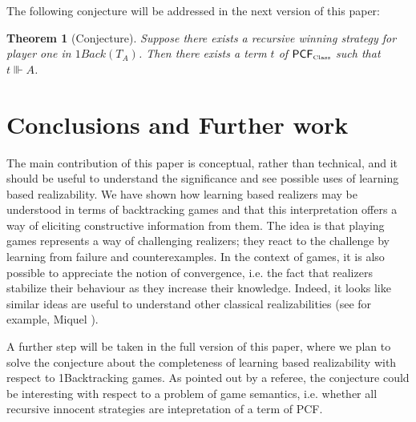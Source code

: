 \documentclass[copyright,creativecommons]{eptcs}
\newcommand{\Class}                    {\mbox{\tiny Class}}
\newcommand{\PRclass}                    {{\mathsf{PCF}_{\Class}}}
\newtheorem{theorem}{Theorem}
\begin{document}
The following conjecture will be addressed in the next version of this paper:

\begin{theorem}[Conjecture]
Suppose there exists a recursive winning strategy for player one in $1Back(T_A)$. Then there exists a term $t$ of $\PRclass$ such that $t\Vvdash A$.

\end{theorem}

\section{Conclusions and Further work}

The main contribution of this paper is conceptual, rather than technical, and it should be useful to understand the significance and see possible uses of learning based realizability. We have shown how learning based realizers may be understood in terms of backtracking games and that this interpretation offers a way of eliciting constructive information from them. The idea is that playing games represents a way of challenging realizers; they react to the challenge by learning from failure and counterexamples. In the context of games, it is also possible to appreciate the notion of convergence, i.e. the fact that realizers stabilize their behaviour as they increase their knowledge. Indeed, it looks like similar ideas are useful to understand other classical realizabilities (see for example, Miquel \cite{Miq}). 

A further step will be taken in the full version of this paper, where we plan to solve the conjecture about the completeness of learning based realizability with respect to 1Backtracking games. As pointed out by a referee, the conjecture could be interesting with respect to a problem of game semantics, i.e. whether all recursive innocent strategies are intepretation of a term of PCF.
\end{document}
